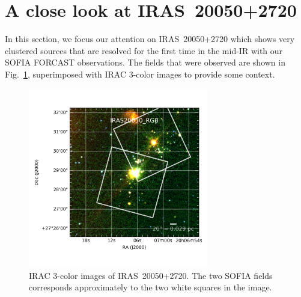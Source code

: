 
\section{A close look at IRAS~20050+2720}
\label{sec:IRAS}

In this section, we focus our attention on IRAS~20050+2720 which shows very clustered sources that are resolved for the first time in the mid-IR with our SOFIA FORCAST observations. The fields that were observed are shown in Fig.~\ref{fig:NGC2071_IRAS20050_RGB}, superimposed with IRAC 3-color images to provide some context.

\begin{figure}
\begin{center}
\includegraphics[width=0.7\textwidth]{Figures/IRAS20050_RGB.png}

\caption[IRAS~20050+2720]{IRAC 3-color images of IRAS~20050+2720. The two SOFIA fields corresponds approximately to the two white squares in the image.}
\label{fig:NGC2071_IRAS20050_RGB}
\end{center}
\end{figure}




